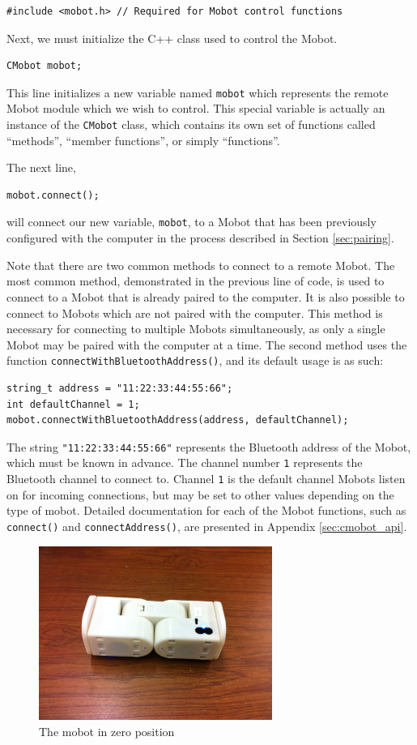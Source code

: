 \documentclass{article}
\begin{document}
\begin{verbatim}
#include <mobot.h> // Required for Mobot control functions
\end{verbatim}

Next, we must initialize the C++ class used to control the Mobot. 

\begin{verbatim}
CMobot mobot;
\end{verbatim}

This line
initializes a new variable named \texttt{mobot} which represents the remote
Mobot module which we wish to control. This special variable is actually an
instance of the \texttt{CMobot} class, which contains its own set of
functions called ``methods'', ``member functions'', or simply ``functions''.

The next line,
\begin{verbatim}
mobot.connect();
\end{verbatim}
will connect our new variable, \texttt{mobot}, to a
Mobot that has been previously configured with the computer in the 
process described in Section \ref{sec:pairing}.

Note that there are two common methods to connect to a remote Mobot. 
The most common method, demonstrated in the previous line of code, is
used to connect to a Mobot that is already paired to the computer. It
is also possible to connect to Mobots which are not paired with the 
computer. This method is necessary for connecting to multiple
Mobots simultaneously, as only a single Mobot may be paired with the
computer at a time. The second method uses the function
\texttt{connectWithBluetoothAddress()}, and its default usage is as such:
\begin{verbatim}
string_t address = "11:22:33:44:55:66";
int defaultChannel = 1;
mobot.connectWithBluetoothAddress(address, defaultChannel);
\end{verbatim}
The string \texttt{"11:22:33:44:55:66"} represents the Bluetooth address
of the Mobot, which must be known in advance. The channel number \texttt{1} 
represents the Bluetooth channel to connect to. Channel \texttt{1}
is the default channel Mobots listen on for incoming connections, but
may be set to other values depending on the type of mobot. Detailed
documentation for each of the Mobot functions, such as 
\texttt{connect()} and \texttt{connectAddress()}, are presented in
Appendix \ref{sec:cmobot_api}.

\begin{figure}
  \centering
  \includegraphics[width=3in]{images/inchworm1.jpg}
  \caption{The mobot in zero position}
  \label{fig:zeroposition}
\end{figure}
\end{document}
